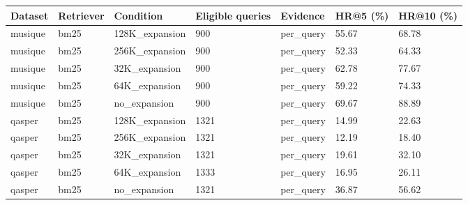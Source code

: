 \begin{tabular}{lllllll}
\hline
Dataset & Retriever & Condition & Eligible queries & Evidence & HR@5 (\%) & HR@10 (\%) \\
\hline
musique & bm25 & 128K\_expansion & 900 & per\_query & 55.67 & 68.78 \\
musique & bm25 & 256K\_expansion & 900 & per\_query & 52.33 & 64.33 \\
musique & bm25 & 32K\_expansion & 900 & per\_query & 62.78 & 77.67 \\
musique & bm25 & 64K\_expansion & 900 & per\_query & 59.22 & 74.33 \\
musique & bm25 & no\_expansion & 900 & per\_query & 69.67 & 88.89 \\
qasper & bm25 & 128K\_expansion & 1321 & per\_query & 14.99 & 22.63 \\
qasper & bm25 & 256K\_expansion & 1321 & per\_query & 12.19 & 18.40 \\
qasper & bm25 & 32K\_expansion & 1321 & per\_query & 19.61 & 32.10 \\
qasper & bm25 & 64K\_expansion & 1333 & per\_query & 16.95 & 26.11 \\
qasper & bm25 & no\_expansion & 1321 & per\_query & 36.87 & 56.62 \\
\hline
\end{tabular}
